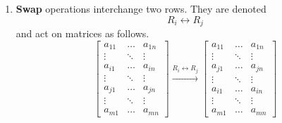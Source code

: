 \begin{enumerate}
\begin{enumerate}
    constant. They are denoted
    \begin{displaymath}
      R_i \gets cR_i
    \end{displaymath}
    where $c \in \R$ and $c \neq 0$ and act on matrices as follows.
    \begin{displaymath}
      \begin{bmatrix}
        a_{11} & \dots & a_{1n} \\
        \vdots & \ddots & \vdots \\
        a_{i1} & \dots & a_{in} \\
        \vdots & \ddots & \vdots \\
        a_{m1} & \dots & a_{mn}
      \end{bmatrix}
      \xrightarrow{R_i \gets cR_i}
      \begin{bmatrix}
        a_{11} & \dots & a_{1n} \\
        \vdots & \ddots & \vdots \\
        ca_{i1} & \dots & ca_{in} \\
        \vdots & \ddots & \vdots \\
        a_{m1} & \dots & a_{mn}
      \end{bmatrix}
    \end{displaymath}
  \item \textbf{Swap} operations interchange two rows.  They are
    denoted
    \begin{displaymath}
      R_i \leftrightarrow R_j
    \end{displaymath}
    and act on matrices as follows.
    \begin{displaymath}
      \begin{bmatrix}
        a_{11} & \dots & a_{1n} \\
        \vdots & \ddots & \vdots \\
        a_{i1} & \dots & a_{in} \\
        \vdots & \ddots & \vdots \\
        a_{j1} & \dots & a_{jn} \\
        \vdots & \ddots & \vdots \\
        a_{m1} & \dots & a_{mn}
      \end{bmatrix}
      \xrightarrow{R_i \leftrightarrow R_j}
      \begin{bmatrix}
        a_{11} & \dots & a_{1n} \\
        \vdots & \ddots & \vdots \\
        a_{j1} & \dots & a_{jn} \\
        \vdots & \ddots & \vdots \\
        a_{i1} & \dots & a_{in} \\
        \vdots & \ddots & \vdots \\
        a_{m1} & \dots & a_{mn}
      \end{bmatrix}
    \end{displaymath}
  \end{enumerate}


\end{enumerate}

